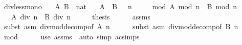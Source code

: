 \begin{isabellebody}
\endisatagproof
{\isafoldproof}%
%
\isadelimproof
\isanewline
%
\endisadelimproof
\isanewline
{}\isamarkupfalse%
\ div{\isacharunderscore}{\kern0pt}less{\isacharunderscore}{\kern0pt}mono{\isacharcolon}{\kern0pt}\isanewline
\ \ \ A\ B\ {\isacharcolon}{\kern0pt}{\isacharcolon}{\kern0pt}\ nat\isanewline
\ \ \ {\isachardoublequoteopen}A\ {\isacharless}{\kern0pt}\ B{\isachardoublequoteclose}\ {\isachardoublequoteopen}{}\ {\isacharless}{\kern0pt}\ n{\isachardoublequoteclose}\ \isanewline
\ \ \ \ mod{\isacharcolon}{\kern0pt}\ {\isachardoublequoteopen}A\ mod\ n\ {\isacharequal}{\kern0pt}\ {}{\isachardoublequoteclose}{\isachardoublequoteopen}B\ mod\ n\ {\isacharequal}{\kern0pt}\ {}{\isachardoublequoteclose}\isanewline
\ \ \ {\isachardoublequoteopen}{\isacharparenleft}{\kern0pt}A\ div\ n{\isacharparenright}{\kern0pt}\ {\isacharless}{\kern0pt}\ {\isacharparenleft}{\kern0pt}B\ div\ n{\isacharparenright}{\kern0pt}{\isachardoublequoteclose}\isanewline
%
\isadelimproof
%
\endisadelimproof
%
\isatagproof
{}\isamarkupfalse%
\ {\isacharminus}{\kern0pt}\isanewline
\ \ \isamarkupfalse%
\ {\isacharquery}{\kern0pt}thesis\isanewline
\ \ \ \ \isamarkupfalse%
\ assms{\isacharparenleft}{\kern0pt}{}{\isacharparenright}{\kern0pt}\isanewline
\ \ \ \ \isamarkupfalse%
\ {\isacharparenleft}{\kern0pt}subst\ {\isacharparenleft}{\kern0pt}asm{\isacharparenright}{\kern0pt}\ div{\isacharunderscore}{\kern0pt}mod{\isacharunderscore}{\kern0pt}decomp{\isacharbrackleft}{\kern0pt}of\ {\isachardoublequoteopen}A{\isachardoublequoteclose}\ n{\isacharbrackright}{\kern0pt}{\isacharparenright}{\kern0pt}\isanewline
\ \ \ \ \isamarkupfalse%
\ {\isacharparenleft}{\kern0pt}subst\ {\isacharparenleft}{\kern0pt}asm{\isacharparenright}{\kern0pt}\ div{\isacharunderscore}{\kern0pt}mod{\isacharunderscore}{\kern0pt}decomp{\isacharbrackleft}{\kern0pt}of\ {\isachardoublequoteopen}B{\isachardoublequoteclose}\ n{\isacharbrackright}{\kern0pt}{\isacharparenright}{\kern0pt}\isanewline
\ \ \ \ \isamarkupfalse%
\ mod\isanewline
\ \ \ \ \isamarkupfalse%
\ {\isacharparenleft}{\kern0pt}use\ assms{\isacharparenleft}{\kern0pt}{}{\isacharcomma}{\kern0pt}{}{\isacharparenright}{\kern0pt}\ \ {\isacartoucheopen}auto\ simp{\isacharcolon}{\kern0pt}\ ac{\isacharunderscore}{\kern0pt}simps{\isacartoucheclose}{\isacharparenright}{\kern0pt}\isanewline

\end{isabellebody}

